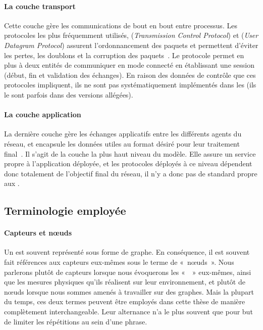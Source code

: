             \paragraph{La couche transport}
Cette couche gère les communications de bout en bout entre processus.
Les protocoles les plus fréquemment utilisés, \tcp (\textit{Transmission Control Protocol}) et \udp (\textit{User Datagram Protocol}) assurent l'ordonnancement des paquets et permettent d'éviter les pertes, les doublons et la corruption des paquets~\cite{TW10}.
Le protocole \tcp permet en plus à deux entités de communiquer en mode connecté en établissant une session (début, fin et validation des échanges).
En raison des données de contrôle que ces protocoles impliquent, ils ne sont pas systématiquement implémentés dans les \rcs (ils le sont parfois dans des versions allégées).

            \paragraph{La couche application}
La dernière couche gère les échanges applicatifs entre les différents agents du réseau, et encapsule les données utiles au format désiré pour leur traitement final~\cite{TW10}.
Il s'agit de la couche la plus haut niveau  du modèle.
Elle assure un service propre à l'application déployée, et les protocoles déployés à ce niveau dépendent donc totalement de l'objectif final du réseau, il n'y a donc pas de standard propre aux \rcs.

    \subsection{Terminologie employée}
            \paragraph{Capteurs et nœuds}
Un \rcsf est souvent représenté sous forme de graphe.
En conséquence, il est souvent fait références aux capteurs eux-mêmes sous le terme de « nœuds ».
Nous parlerons plutôt de capteurs lorsque nous évoquerons les « \rcs » eux-mêmes, ainsi que les mesures physiques qu'ils réalisent sur leur environnement, et plutôt de nœuds lorsque nous sommes amenés à travailler sur des graphes.
Mais la plupart du temps, ces deux termes peuvent être employés dans cette thèse de manière complètement interchangeable.
Leur alternance n'a le plus souvent que pour but de limiter les répétitions au sein d'une phrase.

